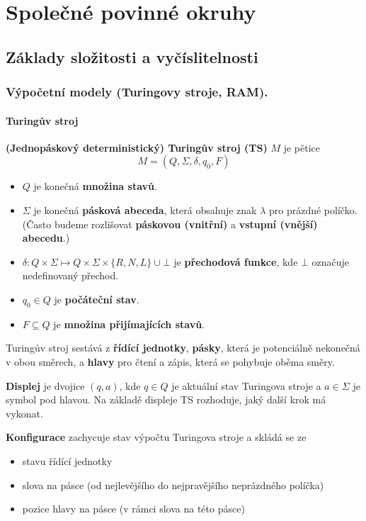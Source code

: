 \documentclass[11pt]{report} %
\numberwithin{equation}{section}
\begin{document}
	
\tableofcontents
\part{Společné povinné okruhy}
\chapter{Základy složitosti a vyčíslitelnosti}
\section{Výpočetní modely (Turingovy stroje, RAM).}
\subsection{Turingův stroj}
\textbf{(Jednopáskový deterministický) Turingův stroj (TS)} $M$ je pětice
$$M = (Q, \Sigma, \delta, q_0, F)$$
\begin{itemize}
	
	
	\item $Q$ je konečná \textbf{množina stavů}.
	\item $\Sigma$ je konečná \textbf{pásková abeceda}, která obsahuje znak $\lambda$ pro prázdné políčko. (Často budeme rozlišovat \textbf{páskovou (vnitřní)} a \textbf{vstupní (vnější) abecedu}.)
	\item $\delta : Q \times \Sigma \mapsto Q \times \Sigma \times \{R, N, L\} \cup {\bot}$ je \textbf{přechodová funkce},
	kde $\bot$ označuje nedefinovaný přechod.
	\item $q_0 \in Q$ je \textbf{počáteční stav}.
	\item $F \subseteq Q$ je \textbf{množina přijímajících stavů}.
\end{itemize}

Turingův stroj sestává z \textbf{řídící jednotky}, \textbf{pásky}, která je potenciálně nekonečná v obou směrech, a
\textbf{hlavy} pro čtení a zápis, která se pohybuje oběma směry.

\textbf{Displej} je dvojice $(q, a)$, kde $q \in Q$ je aktuální stav Turingova stroje a $a \in \Sigma$ je symbol pod hlavou. Na základě displeje TS rozhoduje, jaký další krok má vykonat.

\textbf{Konfigurace} zachycuje stav výpočtu Turingova stroje a skládá se ze
\begin{itemize}
	
	
	\item stavu řídící jednotky
	\item slova na pásce (od nejlevějšího do nejpravějšího neprázdného políčka)
	\item pozice hlavy na pásce (v rámci slova na této pásce)
\end{itemize}
\end{document}
